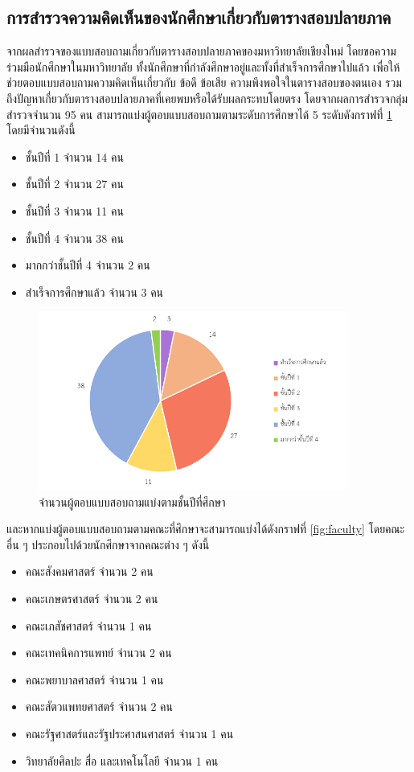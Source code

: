 \subsection{การสำรวจความคิดเห็นของนักศึกษาเกี่ยวกับตารางสอบปลายภาค}
\label{sec:collecting_data}
จากผลสำรวจของแบบสอบถามเกี่ยวกับตารางสอบปลายภาคของมหาวิทยาลัยเชียงใหม่ โดยขอความร่วมมือนักศึกษาในมหาวิทยาลัย
ทั้งนักศึกษาที่กำลังศึกษาอยู่และทั้งที่สำเร็จการศึกษาไปแล้ว เพื่อให้ช่วยตอบแบบสอบถามความคิดเห็นเกี่ยวกับ ข้อดี ข้อเสีย ความพึงพอใจในตารางสอบของตนเอง
รวมถึงปัญหาเกี่ยวกับตารางสอบปลายภาคที่เคยพบหรือได้รับผลกระทบโดยตรง โดยจากผลการสำรวจกลุ่มสำรวจจำนวน 95 คน สามารถแบ่งผู้ตอบแบบสอบถามตามระดับการศึกษาได้ 5 ระดับดังกราฟที่ \ref{fig:academic_year} โดยมีจำนวนดังนี้
\begin{multicols}{2}
\begin{itemize}
  \item ชั้นปีที่ 1 จำนวน 14 คน
  \item ชั้นปีที่ 2 จำนวน 27 คน
  \item ชั้นปีที่ 3 จำนวน 11 คน
  \item ชั้นปีที่ 4 จำนวน 38 คน
  \item มากกว่าชั้นปีที่ 4 จำนวน 2 คน
  \item สำเร็จการศึกษาแล้ว จำนวน 3 คน
\end{itemize}
\end{multicols}
\begin{figure}
  \begin{center}
    \includegraphics[width=4in]{images/group_by_academic_year.png}
  \end{center}
  \caption[จำนวนผู้ตอบแบบสอบถามแบ่งตามชั้นปีที่ศึกษา]{จำนวนผู้ตอบแบบสอบถามแบ่งตามชั้นปีที่ศึกษา}
  \label{fig:academic_year}     
\end{figure}
และหากแบ่งผู้ตอบแบบสอบถามตามคณะที่ศึกษาจะสามารถแบ่งได้ดังกราฟที่ \ref{fig:faculty} 
โดยคณะอื่น ๆ ประกอบไปด้วยนักศึกษาจากคณะต่าง ๆ ดังนี้
\begin{itemize}
  \item คณะสังคมศาสตร์ จำนวน 2 คน
  \item คณะเกษตรศาสตร์ จำนวน 2 คน
  \item คณะเภสัชศาสตร์ จำนวน 1 คน
  \item คณะเทคนิคการแพทย์ จำนวน 2 คน
  \item คณะพยาบาลศาสตร์ จำนวน 1 คน
  \item คณะสัตวแพทยศาสตร์ จำนวน 2 คน
  \item คณะรัฐศาสตร์และรัฐประศาสนศาสตร์ จำนวน 1 คน
  \item วิทยาลัยศิลปะ สื่อ และเทคโนโลยี จำนวน 1 คน
\end{itemize}
